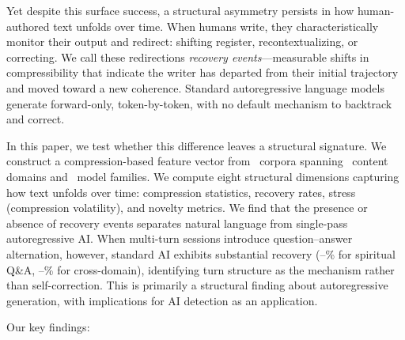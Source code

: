 \documentclass[final]{clv2025}
\begin{document}
Yet despite this surface success, a structural asymmetry persists in how human-authored text unfolds over time. When humans write, they characteristically monitor their output and redirect: shifting register, recontextualizing, or correcting. We call these redirections \textit{recovery events}---measurable shifts in compressibility that indicate the writer has departed from their initial trajectory and moved toward a new coherence. Standard autoregressive language models generate forward-only, token-by-token, with no default mechanism to backtrack and correct.

In this paper, we test whether this difference leaves a structural signature. We construct a compression-based feature vector from \nCorpora\ corpora spanning \nDomains\ content domains and \nModels\ model families. We compute eight structural dimensions capturing how text unfolds over time: compression statistics, recovery rates, stress (compression volatility), and novelty metrics. We find that the presence or absence of recovery events separates natural language from single-pass autoregressive AI. When multi-turn sessions introduce question--answer alternation, however, standard AI exhibits substantial recovery (\recClaudeMT--\recGPTMT\% for spiritual Q\&A, \recMTXdomMin--\recMTXdomMax\% for cross-domain), identifying turn structure as the mechanism rather than self-correction. This is primarily a structural finding about autoregressive generation, with implications for AI detection as an application.

Our key findings:
\end{document}
